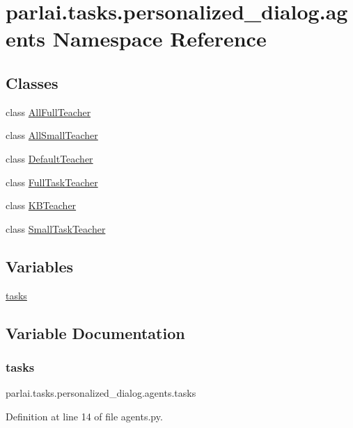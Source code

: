 \hypertarget{namespaceparlai_1_1tasks_1_1personalized__dialog_1_1agents}{}\section{parlai.\+tasks.\+personalized\+\_\+dialog.\+agents Namespace Reference}
\label{namespaceparlai_1_1tasks_1_1personalized__dialog_1_1agents}
\subsection*{Classes}
\begin{DoxyCompactItemize}
\item 
class \hyperlink{classparlai_1_1tasks_1_1personalized__dialog_1_1agents_1_1AllFullTeacher}{All\+Full\+Teacher}
\item 
class \hyperlink{classparlai_1_1tasks_1_1personalized__dialog_1_1agents_1_1AllSmallTeacher}{All\+Small\+Teacher}
\item 
class \hyperlink{classparlai_1_1tasks_1_1personalized__dialog_1_1agents_1_1DefaultTeacher}{Default\+Teacher}
\item 
class \hyperlink{classparlai_1_1tasks_1_1personalized__dialog_1_1agents_1_1FullTaskTeacher}{Full\+Task\+Teacher}
\item 
class \hyperlink{classparlai_1_1tasks_1_1personalized__dialog_1_1agents_1_1KBTeacher}{K\+B\+Teacher}
\item 
class \hyperlink{classparlai_1_1tasks_1_1personalized__dialog_1_1agents_1_1SmallTaskTeacher}{Small\+Task\+Teacher}
\end{DoxyCompactItemize}
\subsection*{Variables}
\begin{DoxyCompactItemize}
\item 
\hyperlink{namespaceparlai_1_1tasks_1_1personalized__dialog_1_1agents_ab6f54f5a7b1f352ae44ecf5a1a949e85}{tasks}
\end{DoxyCompactItemize}


\subsection{Variable Documentation}
\mbox{\label{namespaceparlai_1_1tasks_1_1personalized__dialog_1_1agents_ab6f54f5a7b1f352ae44ecf5a1a949e85}} 
\subsubsection{\texorpdfstring{tasks}{tasks}}
{\footnotesize\ttfamily parlai.\+tasks.\+personalized\+\_\+dialog.\+agents.\+tasks}



Definition at line 14 of file agents.\+py.

